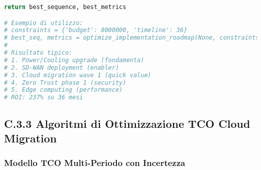 \begin{lstlisting}[language=Python, caption=Algoritmo di Ottimizzazione Roadmap con Vincoli]
    return best_sequence, best_metrics

# Esempio di utilizzo:
# constraints = {'budget': 8000000, 'timeline': 36}
# best_seq, metrics = optimize_implementation_roadmap(None, constraints)
# 
# Risultato tipico:
# 1. Power/Cooling upgrade (fondamenta)
# 2. SD-WAN deployment (enabler)
# 3. Cloud migration wave 1 (quick value)
# 4. Zero Trust phase 1 (security)
# 5. Edge computing (performance)
# ROI: 237% su 36 mesi
\end{lstlisting}

\subsection{C.3.3 Algoritmi di Ottimizzazione TCO Cloud Migration}

\subsubsection{Modello TCO Multi-Periodo con Incertezza}


